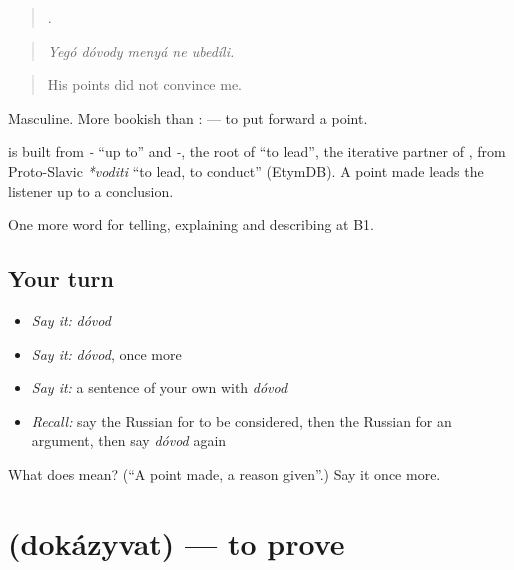 \begin{quote}
    .
\end{quote}

\begin{quote}
\emph{Yegó dóvody menyá ne ubedíli.}
\end{quote}

\begin{quote}
His points did not convince me.
\end{quote}

Masculine. More bookish than \emph{}: \emph{ } — to put forward a point.

\begin{cousinweb}
\textbf{} is built from \emph{-} \textquotedblleft{}up to\textquotedblright{} and \emph{-}, the root of \emph{} \textquotedblleft{}to lead\textquotedblright{}, the iterative partner of \emph{}, from Proto-Slavic \emph{*voditi} \textquotedblleft{}to lead, to conduct\textquotedblright{} (EtymDB). A point made leads the listener up to a conclusion.
\end{cousinweb}

\begin{grammarlens}[title={What you've built}]
One more word for telling, explaining and describing at B1.
\end{grammarlens}

\subsection*{Your turn}
\begin{itemize}
\raggedright
  \item \emph{Say it:} \emph{dóvod}
  \item \emph{Say it:} \emph{dóvod}, once more
  \item \emph{Say it:} a sentence of your own with \emph{dóvod}
  \item \emph{Recall:} say the Russian for to be considered, then the Russian for an argument, then say \emph{dóvod} again
\end{itemize}

\begin{tcolorbox}[breakable,colback=teal!4,colframe=teal!35!black,title={Before you move on}]
What does  mean? (\textquotedblleft{}A point made, a reason given\textquotedblright{}.) Say it once more.
\end{tcolorbox}
\section[\texorpdfstring{\ru{доказывать} (dokázyvat)}{доказывать (dokázyvat)}]{ (dokázyvat) — to prove}

